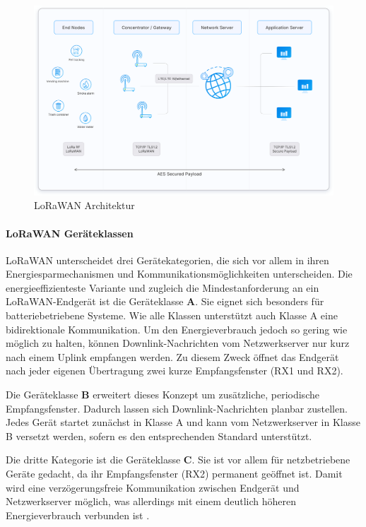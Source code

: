 \begin{figure}[H]
\centering
\includegraphics[scale=.135]{figures/asstes/lorawan-architecture.png}
\caption{LoRaWAN Architektur \cite{LoRaWANArchitecture}}
\label{fig:lorawan-architektur}
\end{figure} 

\paragraph*{LoRaWAN Geräteklassen}
LoRaWAN unterscheidet drei Gerätekategorien, die sich vor allem in ihren Energiesparmechanismen und Kommunikationsmöglichkeiten unterscheiden. Die energieeffizienteste Variante und zugleich die Mindestanforderung an ein LoRaWAN-Endgerät ist die Geräteklasse \textbf{A}. Sie eignet sich besonders für batteriebetriebene Systeme. Wie alle Klassen unterstützt auch Klasse A eine bidirektionale Kommunikation. Um den Energieverbrauch jedoch so gering wie möglich zu halten, können Downlink-Nachrichten vom Netzwerkserver nur kurz nach einem Uplink empfangen werden. Zu diesem Zweck öffnet das Endgerät nach jeder eigenen Übertragung zwei kurze Empfangsfenster (RX1 und RX2).

Die Geräteklasse \textbf{B} erweitert dieses Konzept um zusätzliche, periodische Empfangsfenster. Dadurch lassen sich Downlink-Nachrichten planbar zustellen. Jedes Gerät startet zunächst in Klasse A und kann vom Netzwerkserver in Klasse B versetzt werden, sofern es den entsprechenden Standard unterstützt.

Die dritte Kategorie ist die Geräteklasse \textbf{C}. Sie ist vor allem für netzbetriebene Geräte gedacht, da ihr Empfangsfenster (RX2) permanent geöffnet ist. Damit wird eine verzögerungsfreie Kommunikation zwischen Endgerät und Netzwerkserver möglich, was allerdings mit einem deutlich höheren Energieverbrauch verbunden ist \autocite{sornin2015lorawan}.

